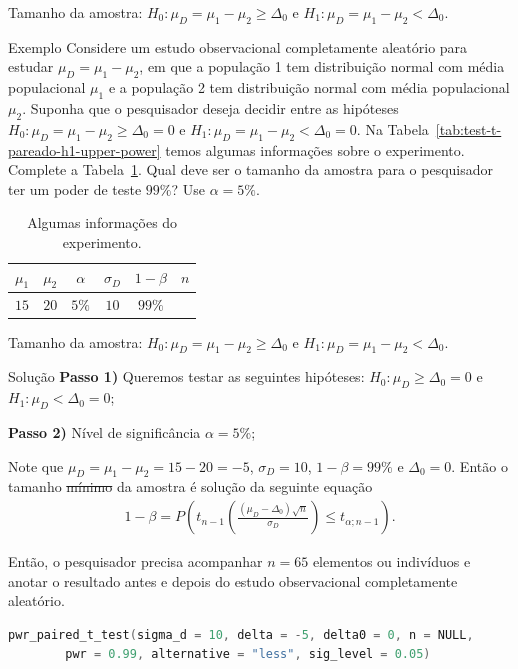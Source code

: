 \documentclass[9pt]{beamer}
\begin{document}
\begin{frame}{Tamanho da amostra: $H_0:\mu_D = \mu_1 - \mu_2 \geq \Delta_0$ e $H_1:\mu_D =  \mu_1 - \mu_2 < \Delta_0$.}

\begin{block}{Exemplo}
	Considere um estudo observacional completamente aleatório para estudar $\mu_D = \mu_1 - \mu_2$, em que a população 1 tem distribuição normal com média populacional $\mu_1$ e a população 2 tem distribuição normal com média populacional $\mu_2$. Suponha que o pesquisador deseja decidir entre as hipóteses $H_0:\mu_D = \mu_1 - \mu_2 \geq \Delta_0=0$ e $H_1: \mu_D = \mu_1 - \mu_2 < \Delta_0=0$. Na Tabela~\ref{tab:test-t-pareado-h1-upper-power} temos algumas informações sobre o experimento. Complete a Tabela~\ref{tab:test-t-pareado-h1-upper-sample-size}. Qual deve ser o tamanho da amostra para o pesquisador ter um poder de teste $99\%$? Use $\alpha = 5\%$.
	
	\begin{table}[htbp]
		\centering
		\begin{tabular}{c|c|c|c|c|c}
			\toprule[0.05cm]
			$\mu_1$ & $\mu_2$ & $\alpha$ & 			$\sigma_D$ & $1-\beta$ & $n$ \\ \midrule[0.025cm]
			$15$ & $20$ & $5\%$ & $10$ & $99\%$ &   \\ \bottomrule[0.05cm]
		\end{tabular}
		\caption{Algumas informações do experimento.}
		\label{tab:test-t-pareado-h1-upper-sample-size}
	\end{table}
\end{block}

\end{frame}

\begin{frame}[fragile]{Tamanho da amostra: $H_0:\mu_D = \mu_1 - \mu_2 \geq \Delta_0$ e $H_1:\mu_D =  \mu_1 - \mu_2 < \Delta_0$.}

\begin{block}{Solução}
	\textbf{Passo 1)} Queremos testar as seguintes hipóteses: $H_0: \mu_D \geq \Delta_0 = 0$ e $H_1: \mu_D < \Delta_0 = 0$;
	
	\textbf{Passo 2)} Nível de significância $\alpha=5\%$;
	
	Note que $\mu_D = \mu_1 - \mu_2 = 15 - 20 = -5$, $\sigma_D = 10$, $1-\beta=99\%$ e $\Delta_0=0$. Então o tamanho \sout{mínimo} da amostra é solução da seguinte equação
	\begin{align*}
	1-\beta = P\left( t_{n-1}\left( \frac{(\mu_D - \Delta_0)\sqrt{n}}{\sigma_D} \right) \leq t_{\alpha;n-1} \right).
	\end{align*}
\end{block}

Então, o pesquisador precisa acompanhar $n=65$ elementos ou indivíduos e anotar o resultado antes e depois do estudo observacional completamente aleatório.

\begin{lstlisting}[language = C, caption = Código no R.]
pwr_paired_t_test(sigma_d = 10, delta = -5, delta0 = 0, n = NULL,
		pwr = 0.99, alternative = "less", sig_level = 0.05)
\end{lstlisting}

\end{frame}
\end{document}
